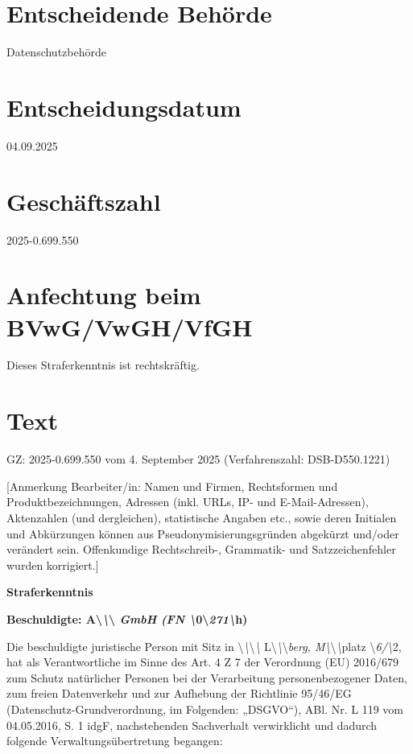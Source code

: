 \documentclass[11pt,a4paper]{article}
\begin{document}
\section{Entscheidende Behörde}

Datenschutzbehörde

\section{Entscheidungsdatum}

04.09.2025

\section{Geschäftszahl}

2025-0.699.550

\section{Anfechtung beim BVwG/VwGH/VfGH}

Dieses Straferkenntnis ist rechtskräftig.

\section{Text}

GZ: 2025-0.699.550 vom 4. September 2025 (Verfahrenszahl: DSB-D550.1221)

[Anmerkung Bearbeiter/in: Namen und Firmen, Rechtsformen und Produktbezeichnungen, Adressen (inkl. URLs, IP- und E-Mail-Adressen), Aktenzahlen (und dergleichen), statistische Angaben etc., sowie deren Initialen und Abkürzungen können aus Pseudonymisierungsgründen abgekürzt und/oder verändert sein. Offenkundige Rechtschreib-, Grammatik- und Satzzeichenfehler wurden korrigiert.]

\textbf{Straferkenntnis}

\textbf{Beschuldigte: A\textbackslash{}\textit{\textbackslash{}}\textbackslash{}\textit{ GmbH (FN \textbackslash{}}0\textbackslash{}\textit{271\textbackslash{}}h)}

Die beschuldigte juristische Person mit Sitz in \textbackslash{}\textit{\textbackslash{}}\textbackslash{}\textit{\textbackslash{}} L\textbackslash{}\textit{\textbackslash{}}\textbackslash{}\textit{berg, M\textbackslash{}}\textbackslash{}\textit{\textbackslash{}}platz \textbackslash{}\textit{6/\textbackslash{}}2, hat als Verantwortliche im Sinne des Art. 4 Z 7 der Verordnung (EU) 2016/679 zum Schutz natürlicher Personen bei der Verarbeitung personenbezogener Daten, zum freien Datenverkehr und zur Aufhebung der Richtlinie 95/46/EG (Datenschutz-Grundverordnung, im Folgenden: „DSGVO“), ABl. Nr. L 119 vom 04.05.2016, S. 1 idgF, nachstehenden Sachverhalt verwirklicht und dadurch folgende Verwaltungsübertretung begangen:
\end{document}
